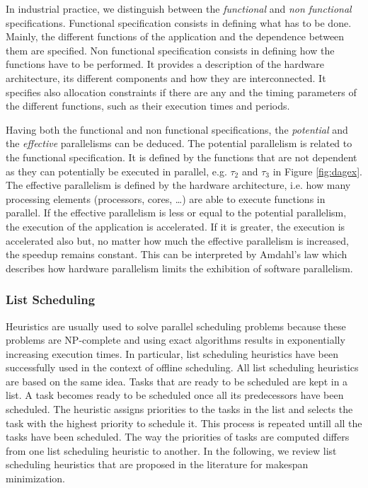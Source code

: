 In industrial practice, we distinguish between the \textit{functional} and \textit{non functional} specifications. Functional specification consists in defining what has to be done. Mainly, the different functions of the application and the dependence between them are specified. Non functional specification consists in defining how the functions have to be performed. It provides a description of the hardware architecture, its different components and how they are interconnected. It specifies also allocation constraints if there are any and the timing parameters of the different functions, such as their execution times and periods.

Having both the functional and non functional specifications, the \textit{potential} and the \textit{effective} parallelisms can be deduced. The potential parallelism is related to the functional specification. It is defined by the functions that are not dependent as they can potentially be executed in parallel, e.g. $\tau_2$ and $\tau_3$ in Figure \ref{fig:dagex}. The effective parallelism is defined by the hardware architecture, i.e. how many processing elements (processors, cores, \ldots) are able to execute functions in parallel. If the effective parallelism is less or equal to the potential parallelism, the execution of the application is accelerated. If it is greater, the execution is accelerated also but, no matter how much the effective parallelism is increased, the speedup remains constant. This can be interpreted by Amdahl's law which describes how hardware parallelism limits the exhibition of software parallelism.


\subsubsection{List Scheduling}

Heuristics are usually used to solve parallel scheduling problems because these problems are NP-complete \cite{garey:2002} and using exact algorithms results in exponentially increasing execution times. In particular, list scheduling heuristics have been successfully used in the context of offline scheduling. All list scheduling heuristics are based on the same idea. Tasks that are ready to be scheduled are kept in a list. A task becomes ready to be scheduled once all its predecessors have been scheduled. The heuristic assigns priorities to the tasks in the list and selects the task with the highest priority to schedule it. This process is repeated untill all the tasks have been scheduled. The way the priorities of tasks are computed differs from one list scheduling heuristic to another. In the following, we review list scheduling heuristics that are proposed in the literature for makespan minimization.

